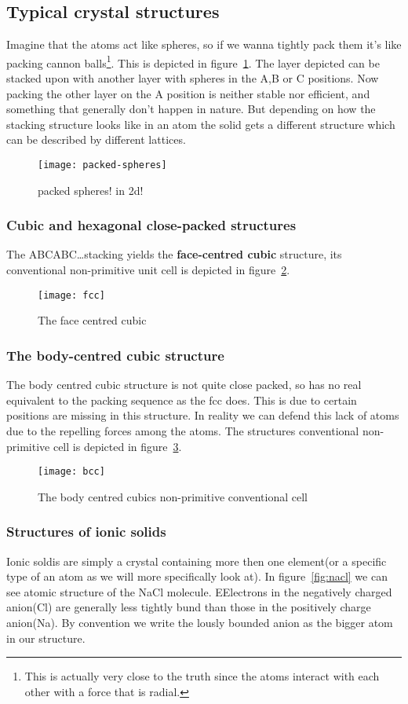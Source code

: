 \documentclass[11pt]{article}
\begin{document}
\subsection{Typical crystal structures}
Imagine that the atoms act like spheres, so if we wanna tightly pack them it's like packing cannon balls\footnote{This is actually very close to the truth since the atoms interact with each other with a force that is radial.}. This is depicted in figure~\ref{fig:packed-spheres}. The layer depicted can be stacked upon with another layer with spheres in the A,B or C positions. Now packing the other layer on the A position is neither stable nor efficient, and something that generally don't happen in nature. But depending on how the stacking structure looks like in an atom the solid gets a different structure which can be described by different lattices. 
\begin{figure}[H]
	\centering
	\texttt{[image: packed-spheres]}
	\caption{packed spheres! in 2d!}
	\label{fig:packed-spheres}
\end{figure}
\subsubsection{Cubic and hexagonal close-packed structures}
The ABCABC\ldots stacking yields the \textbf{face-centred cubic} structure, its conventional non-primitive unit cell is depicted in figure~\ref{fig:fcc}.
\begin{figure}[H]
	\centering
	\texttt{[image: fcc]}
	\caption{The face centred cubic}
	\label{fig:fcc}
\end{figure}
\subsubsection{The body-centred cubic structure}
The body centred cubic structure is not quite close packed, so has no real equivalent to the packing sequence as the fcc does. This is due to certain positions are missing in this structure. In reality we can defend this lack of atoms due to the repelling forces among the atoms. The structures conventional non-primitive cell is depicted in figure~\ref{fig:bcc}.
\begin{figure}[H]
	\centering
	\texttt{[image: bcc]}
	\caption{The body centred cubics non-primitive conventional cell}
	\label{fig:bcc}
\end{figure}

\newpage
\subsubsection{Structures of ionic solids}
Ionic soldis are simply a crystal containing more then one element(or a specific type of an atom as we will more specifically look at). In figure~\ref{fig:nacl} we can see atomic structure of the NaCl molecule.  EElectrons in the negatively charged anion(Cl) are generally less tightly bund than those in the positively charge anion(Na). By convention we write the lously bounded anion as the bigger atom in our structure. 
\end{document}

